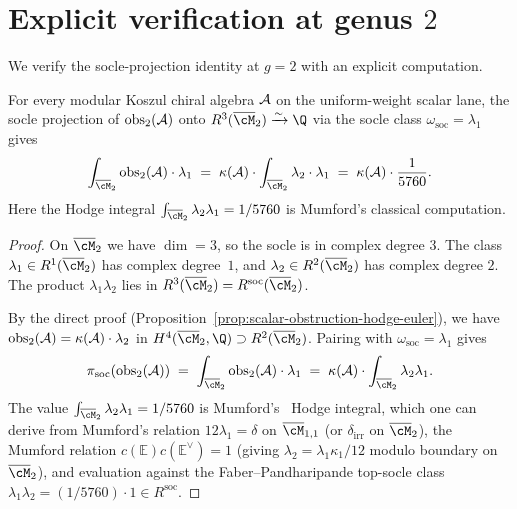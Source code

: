 \section{Explicit verification at genus $2$}
\label{sec:genus-2-explicit}

We verify the socle-projection identity at $g=2$ with an explicit
computation.

\begin{corollary}
\label{cor:genus-2-explicit-match}
For every modular Koszul chiral algebra $\mathcal{A}$ on the uniform-weight
scalar lane, the socle projection of $\mathrm{obs}_2(\mathcal{A})$ onto
$R^3(\overline{\cM}_2) \xrightarrow{\sim} \Q$ via the socle class
$\omega_{\mathrm{soc}} = \lambda_1$ gives
\[
\int_{\overline{\cM}_2}
\mathrm{obs}_2(\cA) \cdot \lambda_1
\;=\;
\kappa(\cA) \cdot \int_{\overline{\cM}_2}
\lambda_2 \cdot \lambda_1
\;=\;
\kappa(\cA) \cdot \frac{1}{5760}.
\]
Here the Hodge integral $\int_{\overline{\cM}_2}\lambda_2\lambda_1
= 1/5760$ is Mumford's classical computation.
\end{corollary}

\begin{proof}
On $\overline{\cM}_2$ we have $\dim = 3$, so the socle is in
complex degree $3$. The class
$\lambda_1 \in R^1(\overline{\cM}_2)$ has complex degree~$1$, and
$\lambda_2 \in R^2(\overline{\cM}_2)$ has complex degree $2$.
The product $\lambda_1\lambda_2$ lies in $R^3(\overline{\cM}_2)
= R^{\mathrm{soc}}(\overline{\cM}_2)$.

By the direct proof
(Proposition~\ref{prop:scalar-obstruction-hodge-euler}), we have
$\mathrm{obs}_2(\mathcal{A}) = \kappa(\mathcal{A})\cdot\lambda_2$ in
$H^4(\overline{\cM}_2,\Q) \supset R^2(\overline{\cM}_2)$. Pairing
with $\omega_{\mathrm{soc}} = \lambda_1$ gives
\[
\pi_{\mathrm{soc}}(\mathrm{obs}_2(\cA))
\;=\;
\int_{\overline{\cM}_2}\mathrm{obs}_2(\cA)\cdot\lambda_1
\;=\;
\kappa(\cA)\cdot\int_{\overline{\cM}_2}\lambda_2\lambda_1.
\]
The value $\int_{\overline{\cM}_2}\lambda_2\lambda_1 = 1/5760$
is Mumford's~\cite{Mumford83} Hodge integral, which one can
derive from Mumford's relation $12\lambda_1 = \delta$ on
$\overline{\cM}_{1,1}$ (or $\delta_{\mathrm{irr}}$ on
$\overline{\cM}_2$), the Mumford relation
$c(\mathbb{E})c(\mathbb{E}^\vee) = 1$ (giving
$\lambda_2 = \lambda_1\kappa_1/12$ modulo boundary on
$\overline{\cM}_2$), and evaluation against the Faber--Pandharipande
top-socle class $\lambda_1\lambda_2 = (1/5760)\cdot 1 \in
R^{\mathrm{soc}}$.
\end{proof}

